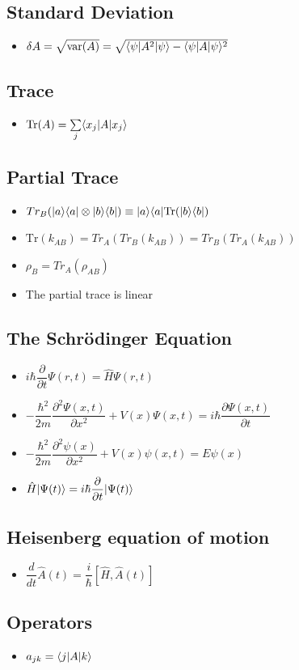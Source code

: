 \documentclass[]{report}
\DeclarePairedDelimiter\bra{\langle}{\rvert}
\DeclarePairedDelimiter\ket{\lvert}{\rangle}
\newcommand \tab[1][1cm]{\hspace*{#1}}
\newcommand{\pp}[2]{\dfrac{\partial #1}{\partial #2}}
\newcommand{\itemt}{\item \tab}
\begin{document}
\subsection{Standard Deviation}
\begin{itemize}
\itemt \( \delta A = \sqrt{\mathrm{var}(A)} = \sqrt{\bra{\psi} A^2 \ket{\psi} - \bra{\psi} A \ket{\psi}^2} \)
\end{itemize}

\subsection{Trace}
\begin{itemize}
\itemt \( \mathrm{Tr} (A) = \sum\limits_{j} \bra{x_j} A \ket{x_j} \)
\end{itemize}

\subsection{Partial Trace}			
\begin{itemize}
\itemt \( Tr_B(\ket{a}\bra{a}\otimes\ket{b}\bra{b}) \equiv \ket{a}\bra{a} \mathrm{Tr} (\ket{b}\bra{b}) \)
\itemt \( \mathrm{Tr} (k_{AB}) = Tr_A(Tr_B(k_{AB})) = Tr_B(Tr_A(k_{AB})) \)
\itemt \( \rho_B = Tr_A(\rho_{AB}) \)
\itemt The partial trace is linear
\end{itemize}

\subsection{The Schr\"odinger Equation}			
\begin{itemize}
\itemt \( i \hbar \dfrac{\partial }{\partial t} \Psi (r,t) = \hat{H} \Psi(r,t) \)
\itemt \( -\dfrac{\hbar^2}{2m} \pp{^2 \Psi(x,t)}{x^2} + V(x)\Psi(x,t) = i\hbar\pp{\Psi(x,t)}{t} \)
\itemt \( -\dfrac{\hbar^2}{2m} \pp{^2 \psi(x)}{x^2} + V(x)\psi(x,t) = E\psi(x) \)
\itemt \( \hat{H}\ket{\Psi(t)} = i\hbar \dfrac{\partial }{\partial t} \ket{\Psi(t)} \)
\end{itemize}

\subsection{Heisenberg equation of motion}			
\begin{itemize}
\itemt \( \dfrac{d}{dt} \hat{A}(t) = \dfrac{i}{\hbar}[\hat{H},\hat{A}(t)] \)
\end{itemize}			

\subsection{Operators}			
\begin{itemize}
\itemt \( a_{jk} = \bra{j} A \ket{k} \)
\end{itemize}			
\end{document}
